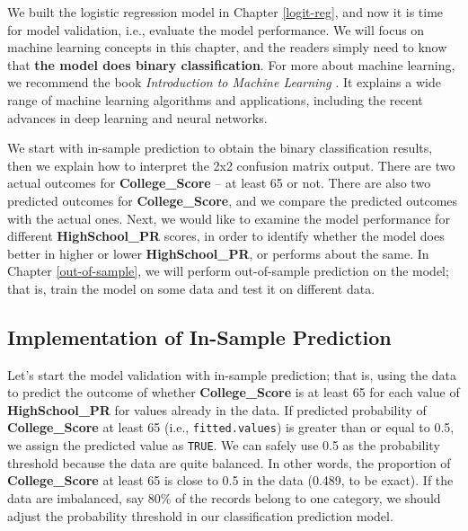 \documentclass[
]{article}
\newenvironment{Shaded}{\begin{snugshade}}{\end{snugshade}}
\newcommand{\CommentTok}[1]{\textcolor[rgb]{0.56,0.35,0.01}{\textit{#1}}}
\newcommand{\FunctionTok}[1]{\textcolor[rgb]{0.00,0.00,0.00}{#1}}
\newcommand{\NormalTok}[1]{#1}
\newcommand{\SpecialCharTok}[1]{\textcolor[rgb]{0.00,0.00,0.00}{#1}}
\newcommand{\StringTok}[1]{\textcolor[rgb]{0.31,0.60,0.02}{#1}}
\begin{document}
We built the logistic regression model in Chapter \ref{logit-reg}, and
now it is time for model validation, i.e., evaluate the model
performance. We will focus on machine learning concepts in this chapter,
and the readers simply need to know that \textbf{the model does binary
classification}. For more about machine learning, we recommend the book
\emph{Introduction to Machine Learning}
\citep{alpaydin2020introduction}. It explains a wide range of machine
learning algorithms and applications, including the recent advances in
deep learning and neural networks.

We start with in-sample prediction to obtain the binary classification
results, then we explain how to interpret the 2x2 confusion matrix
output. There are two actual outcomes for \textbf{College\_Score} -- at
least 65 or not. There are also two predicted outcomes for
\textbf{College\_Score}, and we compare the predicted outcomes with the
actual ones. Next, we would like to examine the model performance for
different \textbf{HighSchool\_PR} scores, in order to identify whether
the model does better in higher or lower \textbf{HighSchool\_PR}, or
performs about the same. In Chapter \ref{out-of-sample}, we will perform
out-of-sample prediction on the model; that is, train the model on some
data and test it on different data.

\hypertarget{in-sample}{%
\subsection{Implementation of In-Sample Prediction}\label{in-sample}}

Let's start the model validation with in-sample prediction; that is,
using the data to predict the outcome of whether \textbf{College\_Score}
is at least 65 for each value of \textbf{HighSchool\_PR} for values
already in the data. If predicted probability of \textbf{College\_Score}
at least 65 (i.e., \texttt{fitted.values}) is greater than or equal to
0.5, we assign the predicted value as \texttt{TRUE}. We can safely use
0.5 as the probability threshold because the data are quite balanced. In
other words, the proportion of \textbf{College\_Score} at least 65 is
close to 0.5 in the data (0.489, to be exact). If the data are
imbalanced, say 80\% of the records belong to one category, we should
adjust the probability threshold in our classification prediction model.

\begin{Shaded}
\end{Shaded}
\end{document}
